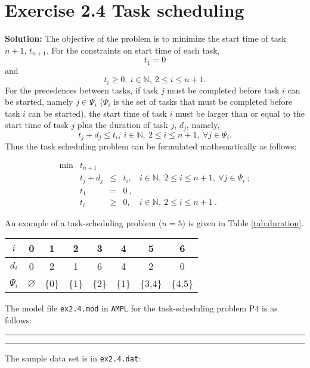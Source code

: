 \section{Exercise 2.4 Task scheduling}
\textbf{Solution:}
The objective of the problem is to minimize the start time of task $n+1$, $t_{n+1}$. For the constraints on start time of each task, $$t_1 = 0$$ and $$t_i \geq 0, ~i \in \mathbb{N}, ~2 \leq i \leq n+1.$$ For the precedences between tasks, if task $j$ must be completed before task $i$ can be started, namely $j \in \Psi_i$ ($\Psi_i$ is the set of tasks that must be completed before task $i$ can be started), the start time of task $i$ must be larger than or equal to the start time of task $j$ plus the duration of task $j$, $d_j$, namely, $$t_j + d_j \leq t_i,~i \in \mathbb{N}, ~2 \leq i \leq n+1,~\forall j \in \Psi_i.$$ Thus the task scheduling problem can be formulated mathematically as follows:

\[
\tag{P4}
\begin{array}{rrcll}
 \min & t_{n+1}  &  &   & \\
      &  t_j + d_j  &   \leq  & t_i, &i \in \mathbb{N}, ~2 \leq i \leq n+1,~\forall j \in \Psi_i~; \\
      &  t_1 & = & 0~, & \\
      &  t_i & \geq & 0, & i \in \mathbb{N}, ~2 \leq i \leq n+1~.
\end{array}
\]

An example of a task-scheduling problem ($n=5$) is given in Table \ref{tab:duration}.

\begin{table*}[!h]
\centering
\small
\begin{tabular}{|c|c|c|c|c|c|c|c|}\hline

$i$ & 0 & 1 & 2 & 3 & 4 & 5 & 6  \\\hline
$d_i$ & 0 & 2 & 1 & 6 & 4 & 2 & 0 \\\hline
$\Psi_i$ & $\varnothing$ & \{0\} & \{1\} & \{2\} & \{1\} & \{3,4\} & \{4,5\} \\\hline
\end{tabular}
\caption{Duration of each task, and precedences between tasks}
\label{tab:duration}
\end{table*}

The model file {\tt ex2.4.mod} in {\tt AMPL} for the task-scheduling problem P4 is as follows:

\bigskip
\hrule 
\small

\normalsize
\hrule
\bigskip

The sample data set is in {\tt ex2.4.dat}:


